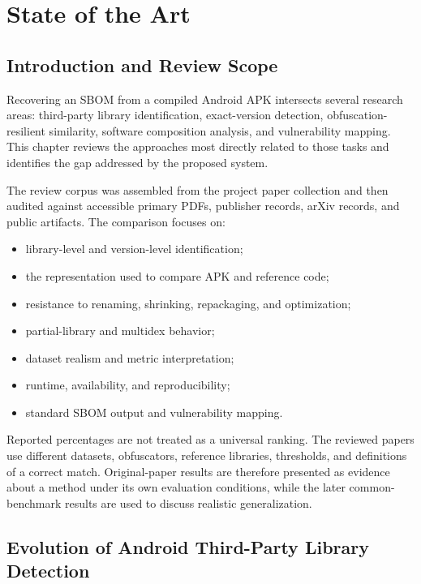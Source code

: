 \chapter{State of the Art}
\label{ch:pfe-sota}

\section{Introduction and Review Scope}

Recovering an SBOM from a compiled Android APK intersects several research
areas: third-party library identification, exact-version detection,
obfuscation-resilient similarity, software composition analysis, and
vulnerability mapping. This chapter reviews the approaches most directly
related to those tasks and identifies the gap addressed by the proposed
system.

The review corpus was assembled from the project paper collection and then
audited against accessible primary PDFs, publisher records, arXiv records, and
public artifacts. The comparison focuses on:

\begin{itemize}
  \item library-level and version-level identification;
  \item the representation used to compare APK and reference code;
  \item resistance to renaming, shrinking, repackaging, and optimization;
  \item partial-library and multidex behavior;
  \item dataset realism and metric interpretation;
  \item runtime, availability, and reproducibility;
  \item standard SBOM output and vulnerability mapping.
\end{itemize}

Reported percentages are not treated as a universal ranking. The reviewed
papers use different datasets, obfuscators, reference libraries, thresholds,
and definitions of a correct match. Original-paper results are therefore
presented as evidence about a method under its own evaluation conditions,
while the later common-benchmark results are used to discuss realistic
generalization.

\section{Evolution of Android Third-Party Library Detection}


